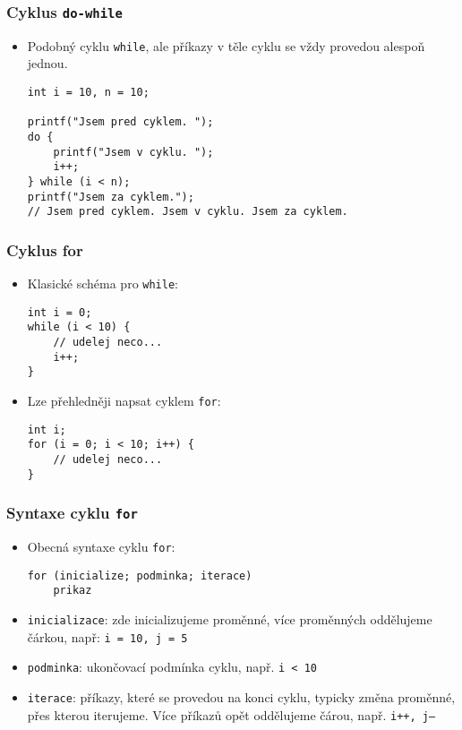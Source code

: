 \documentclass{beamer}
\newenvironment{itemizex}%
  {\large \begin{itemize}%
    \setlength{\itemsep}{8pt}%
    \setlength{\parskip}{8pt}}%
  {\end{itemize}}
\begin{document}
\begin{frame}[t,fragile]\frametitle{Cyklus \texttt{do-while}} 
  \begin{itemizex}
    \item Podobný cyklu \texttt{while}, ale příkazy v těle cyklu se vždy provedou alespoň jednou.
    \begin{verbatim} 
int i = 10, n = 10;

printf("Jsem pred cyklem. ");
do {
    printf("Jsem v cyklu. ");
    i++;
} while (i < n);
printf("Jsem za cyklem.");
// Jsem pred cyklem. Jsem v cyklu. Jsem za cyklem.
    \end{verbatim}
  \end{itemizex}
\end{frame}


\begin{frame}[t,fragile]\frametitle{Cyklus for} 
  \begin{itemizex}
    \item Klasické schéma pro \texttt{while}:
    \begin{verbatim} 
int i = 0;
while (i < 10) {
    // udelej neco...
    i++;
}
    \end{verbatim}
    \item Lze přehledněji napsat cyklem \texttt{for}:
    \begin{verbatim} 
int i;
for (i = 0; i < 10; i++) {
    // udelej neco...
}
    \end{verbatim}
  \end{itemizex}
\end{frame}


\begin{frame}[t,fragile]\frametitle{Syntaxe cyklu \texttt{for}} 
  \begin{itemizex}
    \item Obecná syntaxe cyklu \texttt{for}:
    \begin{verbatim} 
for (inicialize; podminka; iterace)
    prikaz
    \end{verbatim}
    \item \texttt{inicializace}: zde inicializujeme proměnné, více proměnných oddělujeme čárkou, např: \texttt{i = 10, j = 5}
    \item \texttt{podminka}: ukončovací podmínka cyklu, např. \texttt{i < 10}
    \item \texttt{iterace}: příkazy, které se provedou na konci cyklu, typicky změna proměnné, přes kterou iterujeme. Více příkazů opět oddělujeme čárou, např. \texttt{i++, j--}
  \end{itemizex}
\end{frame}
\end{document}
